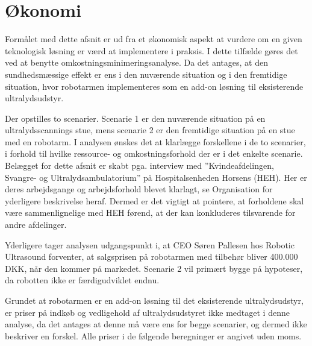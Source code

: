 \chapter{Økonomi} \label{Okonomi}
Formålet med dette afsnit er ud fra et økonomisk aspekt at vurdere om en given teknologisk løsning er værd at implementere i praksis. I dette tilfælde gøres det ved at benytte omkostningsminimeringsanalyse. Da det antages, at den sundhedsmæssige effekt er ens i den nuværende situation og i den fremtidige situation, hvor robotarmen implementeres som en add-on løsning til eksisterende ultralydsudstyr. 

Der opstilles to scenarier. Scenarie 1 er den nuværende situation på en ultralydsscannings stue, mens scenarie 2 er den fremtidige situation på en stue med en robotarm. I analysen ønskes det at klarlægge forskellene i de to scenarier, i forhold til hvilke ressource- og omkostningsforhold der er i det enkelte scenarie. Belægget for dette afsnit er skabt pga. interview med ”Kvindeafdelingen, Svangre- og Ultralydsambulatorium” på Hospitalsenheden Horsens (HEH). Her er deres arbejdsgange og arbejdsforhold blevet klarlagt, se Organisation for yderligere beskrivelse heraf. Dermed er det vigtigt at pointere, at forholdene skal være sammenlignelige med HEH førend, at der kan konkluderes tilsvarende for andre afdelinger. 

Yderligere tager analysen udgangspunkt i, at CEO Søren Pallesen hos Robotic Ultrasound forventer, at salgsprisen på robotarmen med tilbehør bliver 400.000 DKK, når den kommer på markedet. Scenarie 2 vil primært bygge på hypoteser, da robotten ikke er færdigudviklet endnu. 

Grundet at robotarmen er en add-on løsning til det eksisterende ultralydsudstyr, er priser på indkøb og vedligehold af ultralydsudstyret ikke medtaget i denne analyse, da det antages at denne må være ens for begge scenarier, og dermed ikke beskriver en forskel. Alle priser i de følgende beregninger er angivet uden moms. 


